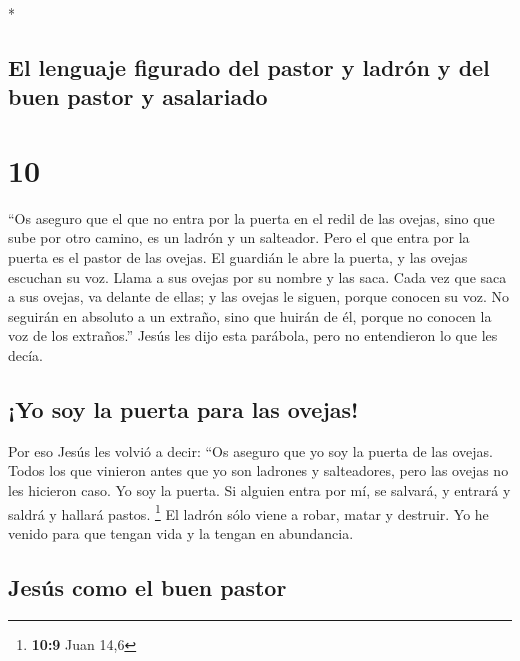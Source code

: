 \begin{paracol}{2}
\switchcolumn[0]*

\hypertarget{el-lenguaje-figurado-del-pastor-y-ladruxf3n-y-del-buen-pastor-y-asalariado}{%
\subsection{El lenguaje figurado del pastor y ladrón y del buen pastor y
asalariado}\label{el-lenguaje-figurado-del-pastor-y-ladruxf3n-y-del-buen-pastor-y-asalariado}}

\hypertarget{section-18}{%
\section{10}\label{section-18}}

 ``Os aseguro que el que no entra por la puerta en el
redil de las ovejas, sino que sube por otro camino, es un ladrón y un
salteador.  Pero el que entra por la puerta es el pastor
de las ovejas.  El guardián le abre la puerta, y las
ovejas escuchan su voz. Llama a sus ovejas por su nombre y las saca.
 Cada vez que saca a sus ovejas, va delante de ellas; y
las ovejas le siguen, porque conocen su voz.  No seguirán
en absoluto a un extraño, sino que huirán de él, porque no conocen la
voz de los extraños.''  Jesús les dijo esta parábola, pero
no entendieron lo que les decía.

\hypertarget{yo-soy-la-puerta-para-las-ovejas}{%
\subsection{¡Yo soy la puerta para las
ovejas!}\label{yo-soy-la-puerta-para-las-ovejas}}

 Por eso Jesús les volvió a decir: ``Os aseguro que yo soy
la puerta de las ovejas.  Todos los que vinieron antes que
yo son ladrones y salteadores, pero las ovejas no les hicieron caso.
 Yo soy la puerta. Si alguien entra por mí, se salvará, y
entrará y saldrá y hallará pastos. \footnote{\textbf{10:9} Juan 14,6}
 El ladrón sólo viene a robar, matar y destruir. Yo he
venido para que tengan vida y la tengan en abundancia.

\hypertarget{jesuxfas-como-el-buen-pastor}{%
\subsection{Jesús como el buen
pastor}\label{jesuxfas-como-el-buen-pastor}}


\end{paracol}
